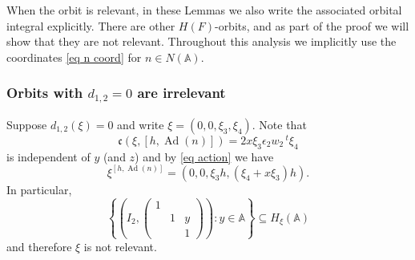 \documentclass[12pt]{amsart}
\newcommand{\Ad}{\operatorname{Ad}}
\newcommand{\A}{\mathbb{A}}
\renewcommand{\c}{\mathfrak{c}}
\theoremstyle{remark}
\begin{document}
When the orbit is relevant, 
in these Lemmas we also write the associated orbital integral explicitly.  There are other $H(F)$-orbits, and as part of the proof we will show that they are not relevant.
Throughout this analysis we implicitly use the coordinates \eqref{eq n coord} for $n\in N(\A)$.


\subsubsection{Orbits with $d_{1,2}=0$ are irrelevant}

Suppose $d_{1,2}(\xi)=0$ and write $\xi=(0,0,\xi_3,\xi_4)$.
Note that 
\[
\c(\xi,[h,\Ad(n)])=2x \xi_3 \epsilon_2 w_2\,{}^t \xi_4
\]
is independent of $y$ (and $z$) and by \eqref{eq action} we have  
\[
\xi^{[h,\Ad(n)]}=(0,0, \xi_3 h,(\xi_4+x\xi_3)h).
\]
In particular, 
\[
\left\{(I_2,\begin{pmatrix} 1 & &  \\ & 1 & y \\ & & 1 \end{pmatrix}): y\in \A\right\}\subseteq H_\xi(\A)
\]
and therefore $\xi$ is not relevant.
\end{document}
